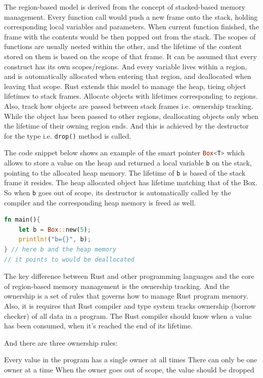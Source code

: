 \documentclass[10pt,a4paper,twocolumn]{article}
\newcommand{\code}[1]{\colorbox{light-gray}{\texttt{#1}}}
\begin{document}
The region-based model is derived from the concept of stacked-based memory management. Every function call would push a new frame onto the stack, holding corresponding local variables and parameters. When current function finished, the frame with the contents would be then popped out from the stack. The scopes of functions are usually nested within the other, and the lifetime of the content stored on them is based on the scope of that frame. It can be assumed that every construct has its own scopes/regions. And every variable lives within a region, and is automatically allocated when entering that region, and deallocated when leaving that scope. Rust extends this model to manage the heap, tieing object lifetimes to stack frames. Allocate objects with lifetimes corresponding to regions. Also, track how objects are passed between stack frames i.e. ownership tracking. While the object has been passed to other regions, deallocating objects only when the lifetime of their owning region ends. And this is achieved by the destructor for the type i.e. \code{drop()} method is called. 

The code snippet below shows an example of the smart pointer \lstinline[language=Rust]{Box<T>} which allows to store a value on the heap and returned a local variable \code{b} on the stack, pointing to the allocated heap memory. The lifetime of \code{b} is based of the stack frame it resides. The heap allocated object has lifetime matching that of the Box. So when \code{b} goes out of scope, its destructor is automatically called by the compiler and the corresponding heap memory is freed as well.
\begin{lstlisting}[language=Rust, style=boxed, caption={Using Box<T> to Point to Data on the Heap}]
fn main(){
    let b = Box::new(5);
    println!("b={}", b);
} // here b and the heap memory 
// it points to would be deallocated
\end{lstlisting}

The key difference between Rust and other programming languages and the core of region-based memory management is the ownership tracking. And the ownership is a set of rules that governs how to manage Rust program memory. Also, it is requires that Rust compiler and type system tracks ownership (borrow checker) of all data in a program. The Rust compiler should know when a value has been consumed, when it’s reached the end of its lifetime.

And there are three ownership rules:
\begin{outline}
    \1 Every value in the program has a single owner at all times
    \1 There can only be one owner at a time
    \1 When the owner goes out of scope, the value should be dropped
\end{outline}
\end{document}

